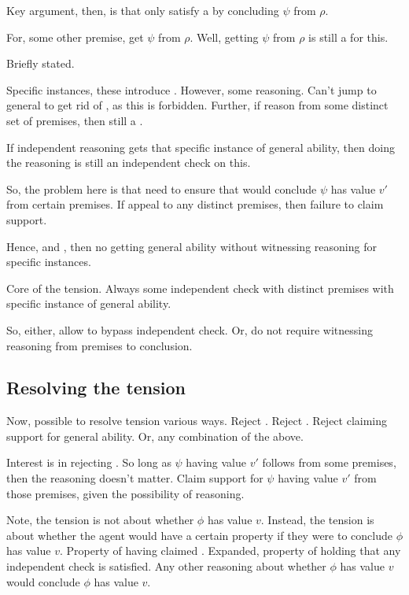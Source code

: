 \begin{note}
  Key argument, then, is that only satisfy a \requ{} by concluding \(\psi\) from \(\rho\).

  For, some other premise, get \(\psi\) from \(\rho\).
  Well, getting \(\psi\) from \(\rho\) is still a \requ{} for this.
\end{note}

\begin{note}
  Briefly stated.

  Specific instances, these introduce \requ{}.
  However, some reasoning.
  Can't jump to general to get rid of \requ{}, as this is forbidden.
  Further, if reason from some distinct set of premises, then still a \requ{}.

  If independent reasoning gets that specific instance of general ability, then doing the reasoning is still an independent check on this.

  So, the problem here is that need to ensure that would conclude \(\psi\) has value \(v'\) from certain premises.
  If appeal to any distinct premises, then failure to claim support.

  Hence, \ESU{} and \ideaCS{}, then no getting general ability without witnessing reasoning for specific instances.

  Core of the tension.
  Always some independent check with distinct premises with specific instance of general ability.

  So, either, allow to bypass independent check.
  Or, do not require witnessing reasoning from premises to conclusion.
\end{note}

\subsection{Resolving the tension}
\label{sec:overview:resolving-tension}

\begin{note}
  Now, possible to resolve tension various ways.
  Reject \ideaCS{}.
  Reject \ESU{}.
  Reject claiming support for general ability.
  Or, any combination of the above.

  Interest is in rejecting \ESU{}.
  So long as \(\psi\) having value \(v'\) follows from some premises, then the reasoning doesn't matter.
  Claim support for \(\psi\) having value \(v'\) from those premises, given the possibility of reasoning.
\end{note}

\begin{note}
  Note, the tension is not about whether \(\phi\) has value \(v\).
  Instead, the tension is about whether the agent would have a certain property if they were to conclude \(\phi\) has value \(v\).
  Property of having claimed \support{}.
  Expanded, property of holding that any independent check is satisfied.
  Any other reasoning about whether \(\phi\) has value \(v\) would conclude \(\phi\) has value \(v\).
\end{note}

